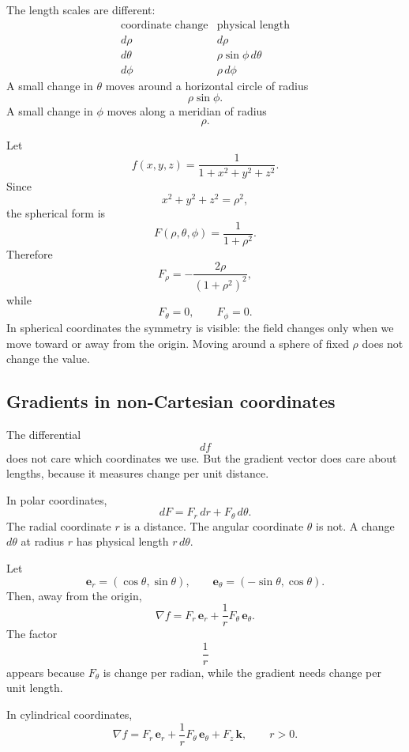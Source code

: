 The length scales are different:
\[
\begin{array}{c|c}
\text{coordinate change} & \text{physical length} \\ \hline
d\rho & d\rho\\[1mm]
d\theta & \rho\sin\phi\,d\theta\\[1mm]
d\phi & \rho\,d\phi
\end{array}
\]
A small change in \(\theta\) moves around a horizontal circle of radius
\[
    \rho\sin\phi.
\]
A small change in \(\phi\) moves along a meridian of radius
\[
    \rho.
\]

\begin{example}
Let
\[
    f(x,y,z)=\frac{1}{1+x^2+y^2+z^2}.
\]
Since
\[
    x^2+y^2+z^2=\rho^2,
\]
the spherical form is
\[
    F(\rho,\theta,\phi)=\frac{1}{1+\rho^2}.
\]
Therefore
\[
    F_\rho=-\frac{2\rho}{(1+\rho^2)^2},
\]
while
\[
    F_\theta=0,
    \qquad
    F_\phi=0.
\]
In spherical coordinates the symmetry is visible: the field changes only when we move
toward or away from the origin.  Moving around a sphere of fixed \(\rho\) does not
change the value.
\end{example}

\subsection{Gradients in non-Cartesian coordinates}

The differential
\[
    df
\]
does not care which coordinates we use.  But the gradient vector does care about
lengths, because it measures change per unit distance.

In polar coordinates,
\[
    dF=F_r\,dr+F_\theta\,d\theta.
\]
The radial coordinate \(r\) is a distance.  The angular coordinate \(\theta\) is not.  A
change \(d\theta\) at radius \(r\) has physical length \(r\,d\theta\).

Let
\[
    \mathbf e_r=(\cos\theta,\sin\theta),
    \qquad
    \mathbf e_\theta=(-\sin\theta,\cos\theta).
\]
Then, away from the origin,
\[
\boxed{
    \nabla f
    =
    F_r\,\mathbf e_r
    +
    \frac{1}{r}F_\theta\,\mathbf e_\theta.
}
\]
The factor
\[
    \frac1r
\]
appears because \(F_\theta\) is change per radian, while the gradient needs change per
unit length.

In cylindrical coordinates,
\[
\boxed{
    \nabla f
    =
    F_r\,\mathbf e_r
    +
    \frac1rF_\theta\,\mathbf e_\theta
    +
    F_z\,\mathbf k,
    \qquad r>0.
}
\]

